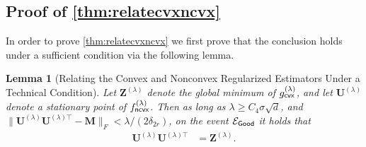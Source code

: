 \documentclass[10pt]{article}
\newtheorem{lemma}{Lemma}
\theoremstyle{definition}
\begin{document}
\subsection{Proof of \cref{thm:relatecvxncvx}}
In order to prove \cref{thm:relatecvxncvx} we first prove that the conclusion holds under a sufficient condition via the following lemma.
\begin{lemma}[Relating the Convex and Nonconvex Regularized Estimators Under a Technical Condition] \label{lem:relatecvxncvx}
    Let $\bm{Z}^{(\lambda)}$ denote the global minimum of $g^{(\lambda)}_{{\sf cvx}}$, and let $\bm{U}^{(\lambda)}$ denote a stationary point of $f^{(\lambda)}_{{\sf ncvx}}$.  Then as long as $\lambda \geq C_4 \sigma \sqrt{d}$, and $ \| \bm{U}^{(\lambda)}\bm{U}^{(\lambda)\top} - \bm{M} \|_F < \lambda/(2\delta_{2r})$,     on the event $\mathcal{E}_{{\sf Good}}$ it holds that
    \begin{align}
        \bm{U}^{(\lambda)} \bm{ U}^{(\lambda)\top} &= \bm{Z}^{(\lambda)}.
    \end{align}
\end{lemma}
\end{document}
